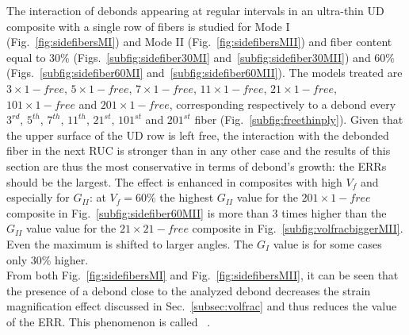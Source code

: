 \documentclass[review]{elsarticle}
\begin{document}
The interaction of debonds appearing at regular intervals in an ultra-thin UD composite with a single row of fibers is studied for Mode I (Fig.~\ref{fig:sidefibersMI}) and Mode II (Fig.~\ref{fig:sidefibersMII}) and fiber content equal to $30\%$ (Figs.~\ref{subfig:sidefiber30MI} and~\ref{subfig:sidefiber30MII}) and $60\%$ (Figs.~\ref{subfig:sidefiber60MI} and~\ref{subfig:sidefiber60MII}). The models treated are $3\times 1-free$, $5\times 1-free$, $7\times 1-free$, $11\times 1-free$, $21\times 1-free$, $101\times 1-free$ and $201\times 1-free$, corresponding respectively to a debond every $3^{rd}$, $5^{th}$, $7^{th}$, $11^{th}$, $21^{st}$, $101^{st}$ and $201^{st}$ fiber (Fig.~\ref{subfig:freethinply}). Given that the upper surface of the UD row is left free, the interaction with the debonded fiber in the next RUC is stronger than in any other case and the results of this section are thus the most conservative in terms of debond's growth: the ERRs should be the largest. The effect is enhanced in composites with high $V_{f}$ and especially for $G_{II}$: at $V_{f}=60\%$ the highest $G_{II}$ value for the $201\times 1-free$ composite in Fig.~\ref{subfig:sidefiber60MII} is more than $3$ times higher than the $G_{II}$ value value for the $21\times21-free$ composite in Fig.~\ref{subfig:volfracbiggerMII}. Even the maximum is shifted to larger angles. The $G_{I}$ value is for some cases only 30\% higher.\\
From both Fig.~\ref{fig:sidefibersMI} and Fig.~\ref{fig:sidefibersMII}, it can be seen that the presence of a debond close to the analyzed debond decreases the strain magnification effect discussed in Sec.~\ref{subsec:volfrac} and thus reduces the value of the ERR. This phenomenon is called ~\cite{Garcia2015}.
\end{document}
